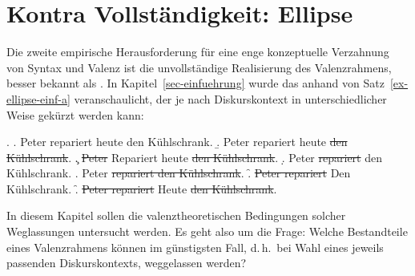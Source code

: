 \chapter{Kontra Vollständigkeit: Ellipse} \label{chap-ellipse}

Die zweite empirische Herausforderung für eine enge konzeptuelle Verzahnung von Syntax und Valenz ist die unvollständige Realisierung des Valenzrahmens, besser bekannt als . In Kapitel~\ref{sec-einfuehrung} wurde das anhand von Satz~\ref{ex-ellipse-einf-a} veranschaulicht, der je nach Diskurskontext in unterschiedlicher Weise gekürzt werden kann: 

  \ex. \label{ex-ellipse-einf}
  \a. \label{ex-ellipse-einf-a}Peter repariert heute den Kühlschrank. 
  \b. Peter repariert heute \sout{den Kühlschrank}.
  \c. \sout{Peter} Repariert heute \sout{den Kühlschrank}.
  \d. Peter \sout{repariert} den Kühlschrank.
  \e. Peter \sout{repariert den Kühlschrank}.
  \f. \sout{Peter repariert} Den Kühlschrank.
  \f. \sout{Peter repariert} Heute \sout{den Kühlschrank}.

In diesem Kapitel sollen die valenztheoretischen Bedingungen solcher Weglassungen untersucht werden. Es geht also um die Frage: Welche Bestandteile eines Valenzrahmens können im günstigsten Fall, d.\,h.\ bei Wahl eines jeweils passenden Diskurskontexts, weggelassen werden?  

